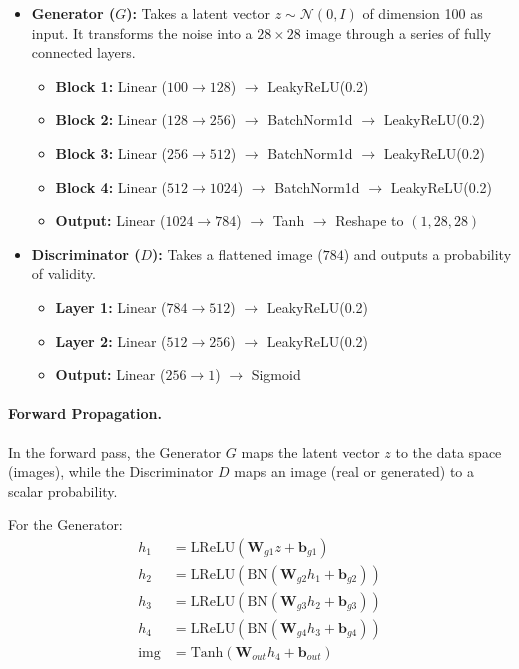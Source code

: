 \documentclass[11pt,a4paper]{article}
\begin{document}
\begin{itemize}
    \item \textbf{Generator ($G$):} Takes a latent vector $z \sim \mathcal{N}(0, I)$ of dimension 100 as input. It transforms the noise into a $28 \times 28$ image through a series of fully connected layers.
    \begin{itemize}
        \item \textbf{Block 1:} Linear ($100 \to 128$) $\to$ LeakyReLU(0.2)
        \item \textbf{Block 2:} Linear ($128 \to 256$) $\to$ BatchNorm1d $\to$ LeakyReLU(0.2)
        \item \textbf{Block 3:} Linear ($256 \to 512$) $\to$ BatchNorm1d $\to$ LeakyReLU(0.2)
        \item \textbf{Block 4:} Linear ($512 \to 1024$) $\to$ BatchNorm1d $\to$ LeakyReLU(0.2)
        \item \textbf{Output:} Linear ($1024 \to 784$) $\to$ Tanh $\to$ Reshape to $(1, 28, 28)$
    \end{itemize}
    
    \item \textbf{Discriminator ($D$):} Takes a flattened image ($784$) and outputs a probability of validity.
    \begin{itemize}
        \item \textbf{Layer 1:} Linear ($784 \to 512$) $\to$ LeakyReLU(0.2)
        \item \textbf{Layer 2:} Linear ($512 \to 256$) $\to$ LeakyReLU(0.2)
        \item \textbf{Output:} Linear ($256 \to 1$) $\to$ Sigmoid
    \end{itemize}
\end{itemize}

\paragraph{Forward Propagation.}
In the forward pass, the Generator $G$ maps the latent vector $z$ to the data space (images), while the Discriminator $D$ maps an image (real or generated) to a scalar probability.

For the Generator:
\begin{align*}
h_1 &= \text{LReLU}(\mathbf{W}_{g1}z + \mathbf{b}_{g1}) \\
h_2 &= \text{LReLU}(\text{BN}(\mathbf{W}_{g2}h_1 + \mathbf{b}_{g2})) \\
h_3 &= \text{LReLU}(\text{BN}(\mathbf{W}_{g3}h_2 + \mathbf{b}_{g3})) \\
h_4 &= \text{LReLU}(\text{BN}(\mathbf{W}_{g4}h_3 + \mathbf{b}_{g4})) \\
\text{img} &= \text{Tanh}(\mathbf{W}_{out}h_4 + \mathbf{b}_{out})
\end{align*}
\end{document}
